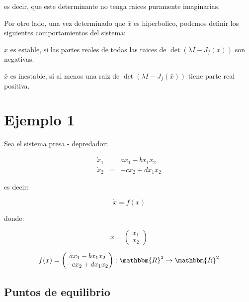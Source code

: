         es decir, que este determinante no tenga raices puramente imaginarias.

        Por otro lado, una vez determinado que $\bar{x}$ es hiperbolico, podemos definir los siguientes comportamientos del sistema:

        $\bar{x}$ es estable, si las partes reales de todas las raices de $\det{(\lambda I - J_f(\bar{x}))}$ son negativas.

        $\bar{x}$ es inestable, si al menos una raiz de $\det{(\lambda I - J_f(\bar{x}))}$ tiene parte real positiva.

    \section{Ejemplo 1}

        Sea el sistema presa - depredador:

        \begin{eqnarray*}
            \dot{x}_1 & = & a x_1 - b x_1 x_2 \\
            \dot{x}_2 & = & -c x_2 + d x_1 x_2
        \end{eqnarray*}

        es decir:

        \begin{equation*}
            \dot{x} = f(x)
        \end{equation*}

        donde:

        \begin{equation}
            x =
            \begin{pmatrix}
                x_1 \\
                x_2
            \end{pmatrix}
        \end{equation}

        \begin{equation} \label{eq:predep}
            f(x) =
            \begin{pmatrix}
                a x_1 - b x_1 x_2 \\
                -c x_2 + d x_1 x_2
            \end{pmatrix} : \mathbbm{R}^2 \to \mathbbm{R}^2 
        \end{equation}

        \subsection{Puntos de equilibrio}

